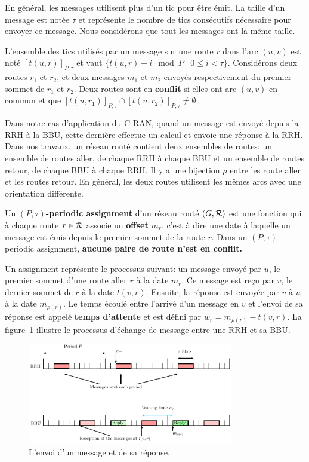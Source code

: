 \documentclass{article}
\begin{document}
En général, les messages utilisent plus d'un tic pour être émit. La taille d'un message est notée $\tau$ et représente le nombre de tics consécutifs nécessaire pour envoyer ce message. Nous considérons que tout les messages ont la même taille.

L'ensemble des tics utilisés par un message sur une route $r$ dans l'arc $(u,v)$ est noté $[t(u,r)]_{P,\tau}$ et vaut $ \{t(u,r) + i \mod P \mid 0 \leq i < \tau \}$.
Considérons deux routes $r_1$ et $r_2$, et deux messages $m_1$ et $m_2$ envoyés respectivement du premier sommet de $r_1$ et $r_2$. Deux routes sont en {\bf conflit} si elles ont arc $(u,v)$ en commun et que $[t(u,r_{1})]_{P,\tau} \cap [t(u,r_{2})]_{P,\tau} \neq \emptyset$.
      
      
      Dans notre cas d'application du C-RAN, quand un message est envoyé depuis la RRH à la BBU, cette dernière effectue un calcul et envoie une réponse à la RRH. Dans nos travaux, un réseau routé contient deux ensembles de routes:  un ensemble de  routes aller, de chaque RRH à chaque BBU et un ensemble de routes retour, de chaque BBU à chaque RRH. Il y a une bijection $\rho$ entre les route aller et les routes retour. En général, les deux routes utilisent les mêmes arcs avec une orientation différente.
      
  Un {\bf $(P,\tau)$-periodic assignment} d'un réseau routé $(G,\cal R)$ est une fonction qui à chaque route  $r \in \cal R$ associe un {\bf offset} $m_r$, c'est à dire une date à laquelle un message est émis depuis le premier sommet de la route $r$. Dans un $(P,\tau)$-periodic assignment, \textbf{aucune paire de route n'est en conflit.}
	 
      Un assignment représente le processus suivant: un message envoyé par $u$, le premier sommet d'une route aller $r$ à la date $m_r$. Ce message est reçu par $v$, le dernier sommet de $r$ à la date $t(v,r)$. Ensuite, la réponse est envoyée par $v$ à $u$ à la date $m_{\rho(r)}$. Le temps écoulé entre l'arrivé d'un message en $v$ et l'envoi de sa réponse est appelé {\bf temps d'attente} et est défini par $w_r = m_{\rho(r)} - t(v,r)$. La figure~\ref{fig:assignment} illustre le processus d'échange de message entre une RRH et sa BBU. 
      
     \begin{figure}[h]
      \begin{center}
      \includegraphics[width=0.8\textwidth]{rrh.pdf}
      \end{center}
      \caption{L'envoi d'un message et de sa réponse.}\label{fig:assignment}
      \end{figure}
      
\end{document}
